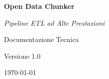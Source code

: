 \documentclass[12pt,a4paper]{report}
\newcommand{\dbicon}[4]{%
    \begin{scope}[shift={(#1,#2)}]
        \fill[#4, draw=black, rounded corners=1pt] (-0.8,-0.4) rectangle (0.8,0.4);
        \draw[black] (-0.8,0) -- (0.8,0);
        \draw[black] (-0.8,-0.2) -- (0.8,-0.2);
        \fill[#4, draw=black] (-0.8,0.4) arc (180:360:0.8 and 0.2) -- (0.8,0.4) arc (0:180:0.8 and 0.2) -- cycle;
        \draw[black] (-0.8,0.4) arc (180:360:0.8 and 0.2);
        \node at (0,-0.6) {\small #3};
    \end{scope}
}
\begin{document}
\begin{titlepage}
    \centering
    \vspace*{2cm}
    
    {\Huge\bfseries Open Data Chunker\par}
    \vspace{0.5cm}
    {\Large\itshape Pipeline ETL ad Alte Prestazioni\par}
    
    \vspace{2cm}
    
        
    
    \vspace{2cm}
    
    {\large Documentazione Tecnica\par}
    \vspace{1cm}
    {\large Versione 1.0\par}
    
    \vfill
    
    {\large \today\par}
\end{titlepage}

\tableofcontents
\newpage










\end{document}
